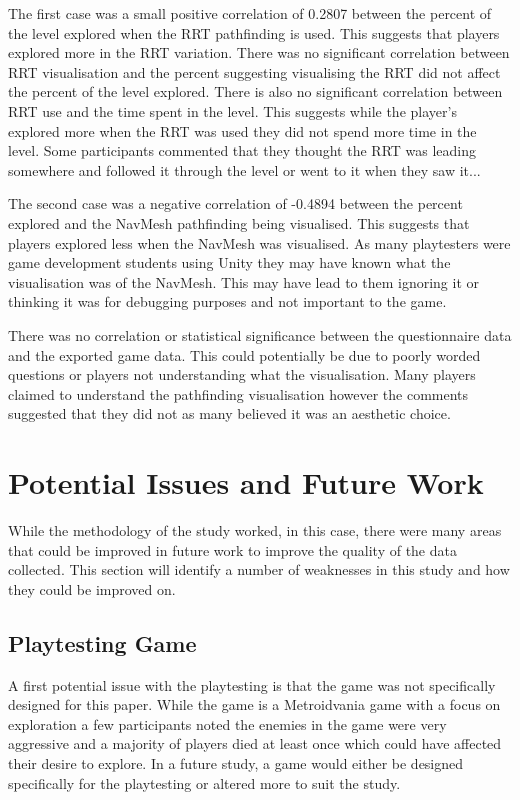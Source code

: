 \documentclass[journal]{IEEEtran}
\begin{document}
	The first case was a small positive correlation of 0.2807 between the percent of the level explored when the RRT pathfinding is used. This suggests that players explored more in the RRT variation. 
	There was no significant correlation between RRT visualisation and the percent suggesting visualising the RRT did not affect the percent of the level explored. There is also no significant correlation between RRT use and the time spent in the level. This suggests while the player's explored more when the RRT was used they did not spend more time in the level.     
	Some participants commented that they thought the RRT was leading somewhere and followed it through the level or went to it when they saw it...    
	
	The second case was a negative correlation of -0.4894 between the percent explored and the NavMesh pathfinding being visualised. This suggests that players explored less when the NavMesh was visualised.  As many playtesters were game development students using Unity they may have known what the visualisation was of the NavMesh. This may have lead to them ignoring it or thinking it was for debugging purposes and not important to the game.
	
	There was no correlation or statistical significance between the questionnaire data and the exported game data. This could potentially be due to poorly worded questions or players not understanding what the visualisation. Many players claimed to understand the pathfinding visualisation however the comments suggested that they did not as many believed it was an aesthetic choice.
	
	
	\section{Potential Issues and Future Work} \label{PotentialIssues}
	While the methodology of the study worked, in this case, there were many areas that could be improved in future work to improve the quality of the data collected. This section will identify a number of weaknesses in this study and how they could be improved on. 
	
	\subsection{Playtesting Game} 
	A first potential issue with the playtesting is that the game was not specifically designed for this paper. While the game is a Metroidvania game with a focus on exploration a few participants noted the enemies in the game were very aggressive and a majority of players died at least once which could have affected their desire to explore. In a future study, a game would either be designed specifically for the playtesting or altered more to suit the study.  
	
\end{document}
